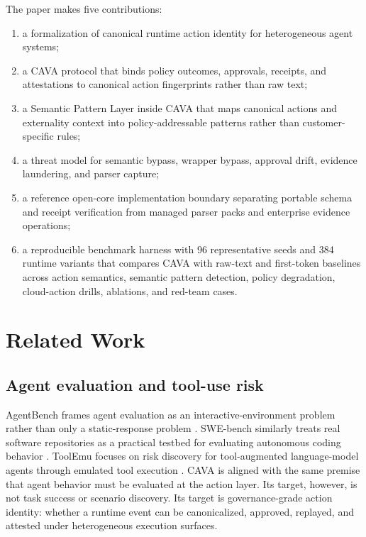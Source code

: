 \documentclass[11pt]{article}
\begin{document}
The paper makes five contributions:
\begin{enumerate}
  \item a formalization of canonical runtime action identity for heterogeneous agent systems;
  \item a CAVA protocol that binds policy outcomes, approvals, receipts, and attestations to canonical action fingerprints rather than raw text;
  \item a Semantic Pattern Layer inside CAVA that maps canonical actions and externality context into policy-addressable patterns rather than customer-specific rules;
  \item a threat model for semantic bypass, wrapper bypass, approval drift, evidence laundering, and parser capture;
  \item a reference open-core implementation boundary separating portable schema and receipt verification from managed parser packs and enterprise evidence operations;
  \item a reproducible benchmark harness with 96 representative seeds and 384 runtime variants that compares CAVA with raw-text and first-token baselines across action semantics, semantic pattern detection, policy degradation, cloud-action drills, ablations, and red-team cases.
\end{enumerate}

\section{Related Work}

\subsection{Agent evaluation and tool-use risk}

AgentBench frames agent evaluation as an interactive-environment problem rather than only a static-response problem \citep{agentbench2023}. SWE-bench similarly treats real software repositories as a practical testbed for evaluating autonomous coding behavior \citep{swebench2023}. ToolEmu focuses on risk discovery for tool-augmented language-model agents through emulated tool execution \citep{toolemu2023}. CAVA is aligned with the same premise that agent behavior must be evaluated at the action layer. Its target, however, is not task success or scenario discovery. Its target is governance-grade action identity: whether a runtime event can be canonicalized, approved, replayed, and attested under heterogeneous execution surfaces.
\end{document}
